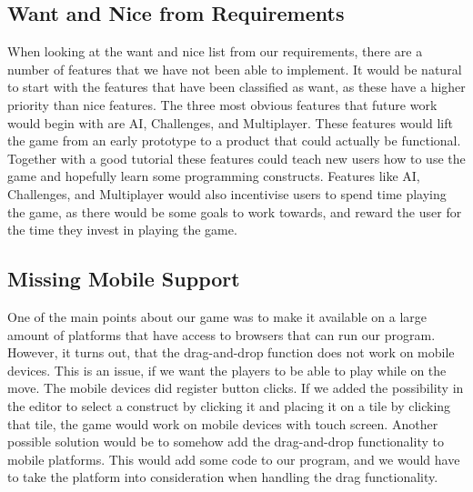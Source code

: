 \subsection{Want and Nice from Requirements}
When looking at the want and nice list from our requirements, there are a number of features that we have not been able to implement. It would be natural to start with the features that have been classified as want, as these have a higher priority than nice features. The three most obvious features that future work would begin with are AI, Challenges, and Multiplayer. These features would lift the game from an early prototype to a product that could actually be functional. Together with a good tutorial these features could teach new users how to use the game and hopefully learn some programming constructs. Features like AI, Challenges, and Multiplayer would also incentivise users to spend time playing the game, as there would be some goals to work towards, and reward the user for the time they invest in playing the game.

\subsection{Missing Mobile Support}
One of the main points about our game was to make it available on a large amount of platforms that have access to browsers that can run our program. However, it turns out, that the drag-and-drop function does not work on mobile devices. This is an issue, if we want the players to be able to play while on the move. The mobile devices did register button clicks. If we added the possibility in the editor to select a construct by clicking it and placing it on a tile by clicking that tile, the game would work on mobile devices with touch screen. Another possible solution would be to somehow add the drag-and-drop functionality to mobile platforms. This would add some code to our program, and we would have to take the platform into consideration when handling the drag functionality.

